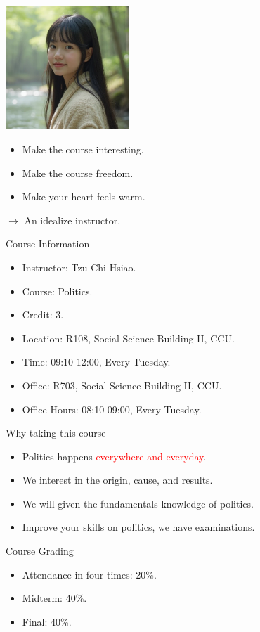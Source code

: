 \documentclass{beamer}
\begin{document}
\begin{frame}{}
\begin{center}
\includegraphics[width=0.35\textwidth]{tchsiao.png}
\end{center}
\begin{itemize}
\item Make the course interesting.
\item Make the course freedom.
\item Make your heart feels warm.
\end{itemize}
$\rightarrow$ An idealize instructor.
\end{frame}
\begin{frame}{Course Information}
\begin{itemize}
\item Instructor: Tzu-Chi Hsiao.
\item Course: Politics.
\item Credit: 3.
\item Location: R108, Social Science Building II, CCU.
\item Time: 09:10-12:00, Every Tuesday.
\item Office: R703, Social Science Building II, CCU.
\item Office Hours: 08:10-09:00, Every Tuesday.
\end{itemize}
\end{frame}
\begin{frame}{Why taking this course}
\begin{itemize}
\item Politics happens \textcolor{red}{everywhere and everyday}.
\item We interest in the origin, cause, and results.
\item We will given the fundamentals knowledge of politics.
\item Improve your skills on politics, we have examinations.
\end{itemize}
\end{frame}
\begin{frame}{Course Grading}
\begin{itemize}
\item Attendance in four times: 20\%.
\item Midterm: 40\%.
\item Final: 40\%.
\end{itemize}
\end{frame}
\end{document}
